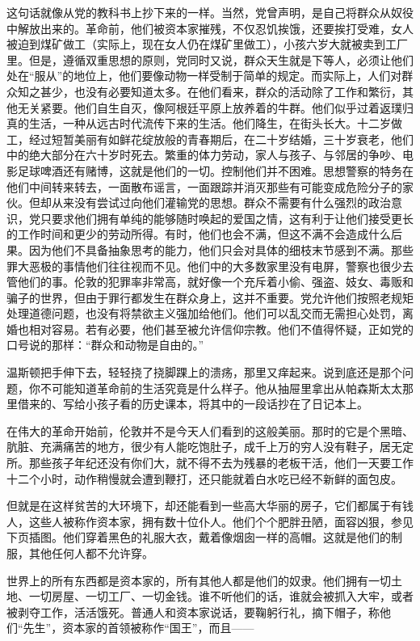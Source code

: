 这句话就像从党的教科书上抄下来的一样。当然，党曾声明，是自己将群众从奴役中解放出来的。革命前，他们被资本家摧残，不仅忍饥挨饿，还要挨打受难，女人被迫到煤矿做工（实际上，现在女人仍在煤矿里做工），小孩六岁大就被卖到工厂里。但是，遵循双重思想的原则，党同时又说，群众天生就是下等人，必须让他们处在``服从''的地位上，他们要像动物一样受制于简单的规定。而实际上，人们对群众知之甚少，也没有必要知道太多。在他们看来，群众的活动除了工作和繁衍，其他无关紧要。他们自生自灭，像阿根廷平原上放养着的牛群。他们似乎过着返璞归真的生活，一种从远古时代流传下来的生活。他们降生，在街头长大。十二岁做工，经过短暂美丽有如鲜花绽放般的青春期后，在二十岁结婚，三十岁衰老，他们中的绝大部分在六十岁时死去。繁重的体力劳动，家人与孩子、与邻居的争吵、电影足球啤酒还有赌博，这就是他们的一切。控制他们并不困难。思想警察的特务在他们中间转来转去，一面散布谣言，一面跟踪并消灭那些有可能变成危险分子的家伙。但却从来没有尝试过向他们灌输党的思想。群众不需要有什么强烈的政治意识，党只要求他们拥有单纯的能够随时唤起的爱国之情，这有利于让他们接受更长的工作时间和更少的劳动所得。有时，他们也会不满，但这不满不会造成什么后果。因为他们不具备抽象思考的能力，他们只会对具体的细枝末节感到不满。那些罪大恶极的事情他们往往视而不见。他们中的大多数家里没有电屏，警察也很少去管他们的事。伦敦的犯罪率非常高，就好像一个充斥着小偷、强盗、妓女、毒贩和骗子的世界，但由于罪行都发生在群众身上，这并不重要。党允许他们按照老规矩处理道德问题，也没有将禁欲主义强加给他们。他们可以乱交而无需担心处罚，离婚也相对容易。若有必要，他们甚至被允许信仰宗教。他们不值得怀疑，正如党的口号说的那样：``群众和动物是自由的。''

温斯顿把手伸下去，轻轻挠了挠脚踝上的溃疡，那里又痒起来。说到底还是那个问题，你不可能知道革命前的生活究竟是什么样子。他从抽屉里拿出从帕森斯太太那里借来的、写给小孩子看的历史课本，将其中的一段话抄在了日记本上。

在伟大的革命开始前，伦敦并不是今天人们看到的这般美丽。那时的它是个黑暗、肮脏、充满痛苦的地方，很少有人能吃饱肚子，成千上万的穷人没有鞋子，居无定所。那些孩子年纪还没有你们大，就不得不去为残暴的老板干活，他们一天要工作十二个小时，动作稍慢就会遭到鞭打，还只能就着白水吃已经不新鲜的面包皮。

但就是在这样贫苦的大环境下，却还能看到一些高大华丽的房子，它们都属于有钱人，这些人被称作资本家，拥有数十位仆人。他们个个肥胖丑陋，面容凶狠，参见下页插图。他们穿着黑色的礼服大衣，戴着像烟囱一样的高帽。这就是他们的制服，其他任何人都不允许穿。

世界上的所有东西都是资本家的，所有其他人都是他们的奴隶。他们拥有一切土地、一切房屋、一切工厂、一切金钱。谁不听他们的话，谁就会被抓入大牢，或者被剥夺工作，活活饿死。普通人和资本家说话，要鞠躬行礼，摘下帽子，称他们``先生''，资本家的首领被称作``国王''，而且------


